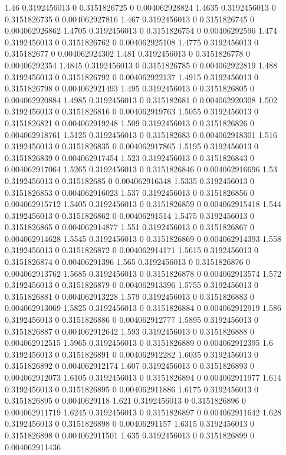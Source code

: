 {1.46 0.3192456013 0 0.3151826725 0 0.004062928824
1.4635 0.3192456013 0 0.3151826735 0 0.004062927816
1.467 0.3192456013 0 0.3151826745 0 0.004062926862
1.4705 0.3192456013 0 0.3151826754 0 0.00406292596
1.474 0.3192456013 0 0.3151826762 0 0.004062925108
1.4775 0.3192456013 0 0.315182677 0 0.004062924302
1.481 0.3192456013 0 0.3151826778 0 0.00406292354
1.4845 0.3192456013 0 0.3151826785 0 0.004062922819
1.488 0.3192456013 0 0.3151826792 0 0.004062922137
1.4915 0.3192456013 0 0.3151826798 0 0.004062921493
1.495 0.3192456013 0 0.3151826805 0 0.004062920884
1.4985 0.3192456013 0 0.315182681 0 0.004062920308
1.502 0.3192456013 0 0.3151826816 0 0.004062919763
1.5055 0.3192456013 0 0.3151826821 0 0.004062919248
1.509 0.3192456013 0 0.3151826826 0 0.004062918761
1.5125 0.3192456013 0 0.315182683 0 0.004062918301
1.516 0.3192456013 0 0.3151826835 0 0.004062917865
1.5195 0.3192456013 0 0.3151826839 0 0.004062917454
1.523 0.3192456013 0 0.3151826843 0 0.004062917064
1.5265 0.3192456013 0 0.3151826846 0 0.004062916696
1.53 0.3192456013 0 0.315182685 0 0.004062916348
1.5335 0.3192456013 0 0.3151826853 0 0.004062916023
1.537 0.3192456013 0 0.3151826856 0 0.004062915712
1.5405 0.3192456013 0 0.3151826859 0 0.004062915418
1.544 0.3192456013 0 0.3151826862 0 0.00406291514
1.5475 0.3192456013 0 0.3151826865 0 0.004062914877
1.551 0.3192456013 0 0.3151826867 0 0.004062914628
1.5545 0.3192456013 0 0.3151826869 0 0.004062914393
1.558 0.3192456013 0 0.3151826872 0 0.004062914171
1.5615 0.3192456013 0 0.3151826874 0 0.00406291396
1.565 0.3192456013 0 0.3151826876 0 0.004062913762
1.5685 0.3192456013 0 0.3151826878 0 0.004062913574
1.572 0.3192456013 0 0.3151826879 0 0.004062913396
1.5755 0.3192456013 0 0.3151826881 0 0.004062913228
1.579 0.3192456013 0 0.3151826883 0 0.004062913069
1.5825 0.3192456013 0 0.3151826884 0 0.004062912919
1.586 0.3192456013 0 0.3151826886 0 0.004062912777
1.5895 0.3192456013 0 0.3151826887 0 0.004062912642
1.593 0.3192456013 0 0.3151826888 0 0.004062912515
1.5965 0.3192456013 0 0.3151826889 0 0.004062912395
1.6 0.3192456013 0 0.3151826891 0 0.004062912282
1.6035 0.3192456013 0 0.3151826892 0 0.004062912174
1.607 0.3192456013 0 0.3151826893 0 0.004062912073
1.6105 0.3192456013 0 0.3151826894 0 0.004062911977
1.614 0.3192456013 0 0.3151826895 0 0.004062911886
1.6175 0.3192456013 0 0.3151826895 0 0.0040629118
1.621 0.3192456013 0 0.3151826896 0 0.004062911719
1.6245 0.3192456013 0 0.3151826897 0 0.004062911642
1.628 0.3192456013 0 0.3151826898 0 0.00406291157
1.6315 0.3192456013 0 0.3151826898 0 0.004062911501
1.635 0.3192456013 0 0.3151826899 0 0.004062911436
}
